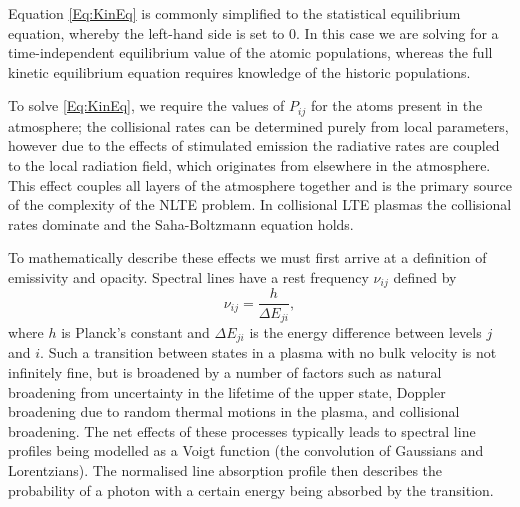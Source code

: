 Equation \eqref{Eq:KinEq} is commonly simplified to the statistical equilibrium equation, whereby the left-hand side is set to 0. In this case we are solving for a time-independent equilibrium value of the atomic populations, whereas the full kinetic equilibrium equation requires knowledge of the historic populations.

To solve \eqref{Eq:KinEq}, we require the values of $P_{ij}$ for the atoms present in the atmosphere; the collisional rates can be determined purely from local parameters, however due to the effects of stimulated emission the radiative rates are coupled to the local radiation field, which originates from elsewhere in the atmosphere. This effect couples all layers of the atmosphere together and is the primary source of the complexity of the NLTE problem. In collisional LTE plasmas the collisional rates dominate and the Saha-Boltzmann equation holds.

To mathematically describe these effects we must first arrive at a definition of emissivity and opacity.
Spectral lines have a rest frequency $\nu_{ij}$  defined by
\begin{equation}
    \nu_{ij} = \frac{h}{\Delta E_{ji}},
\end{equation}
where $h$ is Planck's constant and $\Delta E_{ji}$ is the energy difference between levels $j$ and $i$.
Such a transition between states in a plasma with no bulk velocity is not infinitely fine, but is broadened by a number of factors such as natural broadening from uncertainty in the lifetime of the upper state, Doppler broadening due to random thermal motions in the plasma, and collisional broadening.
The net effects of these processes typically leads to spectral line profiles being modelled as a Voigt function (the convolution of Gaussians and Lorentzians). The normalised line absorption profile then describes the probability of a photon with a certain energy being absorbed by the transition.


